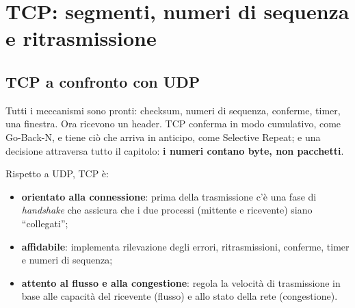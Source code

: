 \chapter{TCP: segmenti, numeri di sequenza e ritrasmissione}

\section{TCP a confronto con UDP}

Tutti i meccanismi sono pronti: checksum, numeri di sequenza, conferme, timer, una finestra. Ora ricevono un header.
TCP conferma in modo cumulativo, come Go-Back-N, e tiene ciò che arriva in anticipo, come Selective Repeat; e una
decisione attraversa tutto il capitolo: \textbf{i numeri contano byte, non pacchetti}.

Rispetto a UDP, TCP è:

\begin{itemize}
    \item \textbf{orientato alla connessione}: prima della trasmissione c'è una fase di \emph{handshake} che
          assicura che i due processi (mittente e ricevente) siano ``collegati'';
    \item \textbf{affidabile}: implementa rilevazione degli errori, ritrasmissioni, conferme, timer e numeri di sequenza;
    \item \textbf{attento al flusso e alla congestione}: regola la velocità di trasmissione in base alle capacità
          del ricevente (flusso) e allo stato della rete (congestione).
\end{itemize}


